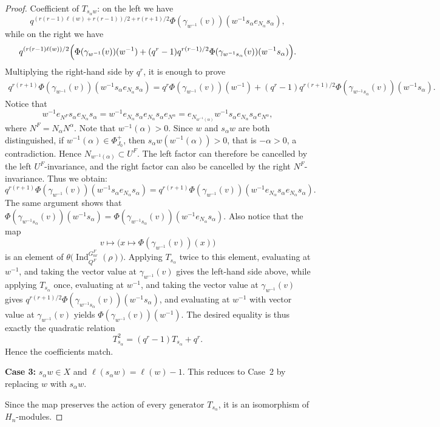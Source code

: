 \documentclass[12pt]{article}
\theoremstyle{remark}
\begin{document}
\begin{proof}
\noindent Coefficient of $T_{s_\alpha w}$: on the left we have
$$
q^{(r(r-1)\ell(w) + r(r-1))/2 + r(r+1)/2} \Phi(\gamma_{w^{-1}}(v))(w^{-1} s_\alpha e_{N_\alpha} s_\alpha),
$$
while on the right we have
$$
q^{(r(r-1)\ell(w))/2} \Bigl( \Phi(\gamma_{w^{-1}}(v))(w^{-1}) + (q^r-1) q^{r(r-1)/2} \Phi(\gamma_{w^{-1}s_\alpha}(v))(w^{-1} s_\alpha) \Bigr).
$$
Multiplying the right-hand side by $q^r$, it is enough to prove
\begin{align*}
q^{r(r+1)} \Phi(\gamma_{w^{-1}}(v))(w^{-1} s_\alpha e_{N_\alpha} s_\alpha)
= q^r \Phi(\gamma_{w^{-1}}(v))(w^{-1}) + (q^r-1) q^{r(r+1)/2} \Phi(\gamma_{w^{-1}s_\alpha}(v))(w^{-1} s_\alpha).
\end{align*}
Notice that
$$
w^{-1}e_{N^F}s_{\alpha}e_{N_\alpha}s_\alpha = w^{-1}e_{N_\alpha}s_\alpha e_{N_\alpha}s_\alpha e_{N^{\alpha}} = e_{N_{w^{-1}(\alpha)}} w^{-1}s_\alpha e_{N_\alpha}s_\alpha e_{N^{\alpha}},
$$
where $N^F = N_{\alpha}N^{\alpha}$.
Note that $w^{-1}(\alpha)>0$. Since $w$ and $s_\alpha w$ are both distinguished, if $w^{-1}(\alpha) \in \Phi_{J_0}^+$, then $s_\alpha w(w^{-1}(\alpha))>0$, that is $-\alpha>0$, a contradiction. Hence $N_{w^{-1}(\alpha)} \subset U^F$. The left factor can therefore be cancelled by the left $U^F$-invariance, and the right factor can also be cancelled by the right $N^F$-invariance. Thus we obtain:
$$
q^{r(r+1)} \Phi(\gamma_{w^{-1}}(v))(w^{-1} s_\alpha e_{N_\alpha} s_\alpha) = q^{r(r+1)} \Phi(\gamma_{w^{-1}}(v))(w^{-1} e_{N_\alpha}s_\alpha e_{N_\alpha} s_\alpha) .
$$
The same argument shows that $\Phi(\gamma_{w^{-1}s_\alpha}(v))(w^{-1} s_\alpha) = \Phi(\gamma_{w^{-1}s_\alpha}(v))(w^{-1} e_{N_\alpha}s_\alpha)$.
Also notice that the map
$$
v \longmapsto \bigl( x \mapsto \Phi(\gamma_{w^{-1}}(v))(x) \bigr)
$$
is an element of $\theta\bigl( \operatorname{Ind}_{Q^F}^{G_{nr}^F}(\rho) \bigr)$. Applying $T_{s_\alpha}$ twice to this element, evaluating at $w^{-1}$, and taking the vector value at $\gamma_{w^{-1}}(v)$ gives the left-hand side above, while applying $T_{s_\alpha}$ once, evaluating at $w^{-1}$, and taking the vector value at $\gamma_{w^{-1}}(v)$ gives $q^{r(r+1)/2} \Phi(\gamma_{w^{-1}s_\alpha}(v))(w^{-1} s_\alpha)$, and evaluating at $w^{-1}$ with vector value at $\gamma_{w^{-1}}(v)$ yields $\Phi(\gamma_{w^{-1}}(v))(w^{-1})$. The desired equality is thus exactly the quadratic relation
$$
T_{s_\alpha}^2 = (q^r-1) T_{s_\alpha} + q^r.
$$
Hence the coefficients match.

\noindent\textbf{Case 3:} $s_\alpha w \in X$ and $\ell(s_\alpha w) = \ell(w) - 1$.
This reduces to Case~2 by replacing $w$ with $s_\alpha w$.

Since the map preserves the action of every generator $T_{s_\alpha}$, it is an isomorphism of $H_n$-modules.
\end{proof}
\end{document}
